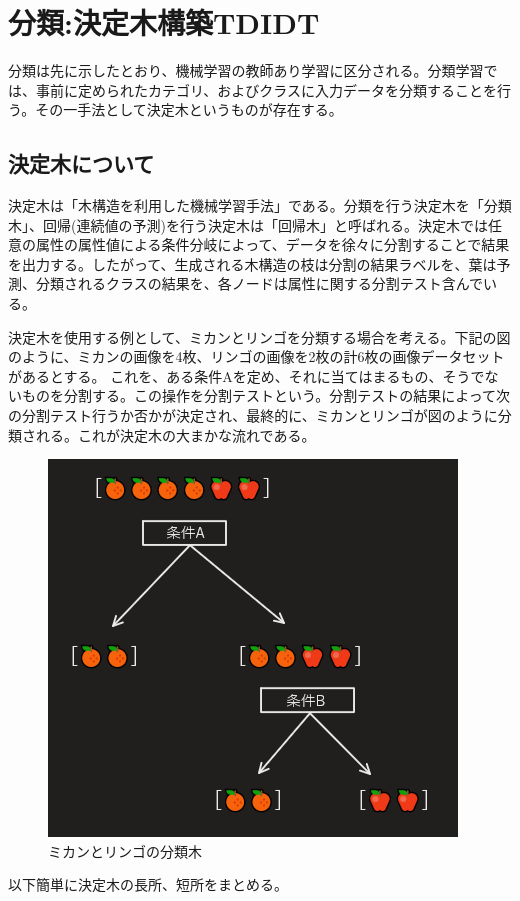 \documentclass[dvipdfmx]{jsarticle}
\begin{document}
\section{分類:決定木構築TDIDT}
分類は先に示したとおり、機械学習の教師あり学習に区分される。分類学習では、事前に定められたカテゴリ、およびクラスに入力データを分類することを行う。その一手法として決定木というものが存在する。\par
\subsection{決定木について}
決定木は「木構造を利用した機械学習手法」である。分類を行う決定木を「分類木」、回帰(連続値の予測)を行う決定木は「回帰木」と呼ばれる。決定木では任意の属性の属性値による条件分岐によって、データを徐々に分割することで結果を出力する。したがって、生成される木構造の枝は分割の結果ラベルを、葉は予測、分類されるクラスの結果を、各ノードは属性に関する分割テスト含んでいる。\par
決定木を使用する例として、ミカンとリンゴを分類する場合を考える。下記の図のように、ミカンの画像を4枚、リンゴの画像を2枚の計6枚の画像データセットがあるとする。
これを、ある条件Aを定め、それに当てはまるもの、そうでないものを分割する。この操作を分割テストという。分割テストの結果によって次の分割テスト行うか否かが決定され、最終的に、ミカンとリンゴが図のように分類される。これが決定木の大まかな流れである。
\begin{figure}[H]
  \centering
  \includegraphics[scale=0.6]{images/decition_ex1.PNG}
  \caption{ミカンとリンゴの分類木}
\end{figure}
以下簡単に決定木の長所、短所をまとめる。
\end{document}
